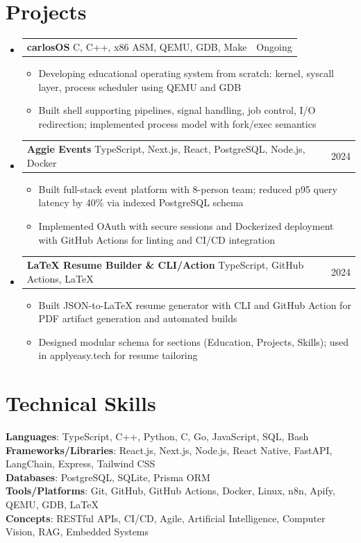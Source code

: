 \documentclass[letterpaper,11pt]{article}
\makeatletter
\newcommand{\resumeItem}[1]{
  \item\small{{#1 \vspace{-2pt}}}
}
\newcommand{\resumeProjectHeading}[2]{
    \item
    \begin{tabular*}{0.97\textwidth}{l@{\extracolsep{\fill}}r}
      \small#1 & #2 \\
    \end{tabular*}\vspace{-7pt}
}
\newcommand{\resumeSubHeadingListStart}{\begin{itemize}[leftmargin=0.15in, label={}]}
\newcommand{\resumeSubHeadingListEnd}{\end{itemize}}
\newcommand{\resumeItemListStart}{\begin{itemize}}
\newcommand{\resumeItemListEnd}{\end{itemize}\vspace{-5pt}}
\makeatother
\begin{document}
\section{Projects}
\resumeSubHeadingListStart
  \resumeProjectHeading
    {\textbf{carlosOS}  \textbullet{} C, C++, x86 ASM, QEMU, GDB, Make}{Ongoing}
    \resumeItemListStart
      \resumeItem{Developing educational operating system from scratch: kernel, syscall layer, process scheduler using QEMU and GDB}
      \resumeItem{Built shell supporting pipelines, signal handling, job control, I/O redirection; implemented process model with fork/exec semantics}
    \resumeItemListEnd

  \resumeProjectHeading
    {\textbf{Aggie Events} \textbullet{} TypeScript, Next.js, React, PostgreSQL, Node.js, Docker}{2024}
    \resumeItemListStart
      \resumeItem{Built full-stack event platform with 8-person team; reduced p95 query latency by 40\% via indexed PostgreSQL schema}
      \resumeItem{Implemented OAuth with secure sessions and Dockerized deployment with GitHub Actions for linting and CI/CD integration}
    \resumeItemListEnd

  \resumeProjectHeading
    {\textbf{LaTeX Resume Builder \& CLI/Action} \textbullet{} TypeScript, GitHub Actions, LaTeX}{2024}
    \resumeItemListStart
      \resumeItem{Built JSON-to-LaTeX resume generator with CLI and GitHub Action for PDF artifact generation and automated builds}
      \resumeItem{Designed modular schema for sections (Education, Projects, Skills); used in applyeasy.tech for resume tailoring}
    \resumeItemListEnd
\resumeSubHeadingListEnd

\section{Technical Skills}
\begin{itemize}[leftmargin=0.15in, label={}]
  \small{\item{
    \textbf{Languages}{: TypeScript, C++, Python, C, Go, JavaScript, SQL, Bash} \\
    \textbf{Frameworks/Libraries}{: React.js, Next.js, Node.js, React Native, FastAPI, LangChain, Express, Tailwind CSS} \\
    \textbf{Databases}{: PostgreSQL, SQLite, Prisma ORM} \\
    \textbf{Tools/Platforms}{: Git, GitHub, GitHub Actions, Docker, Linux, n8n, Apify, QEMU, GDB, LaTeX} \\
    \textbf{Concepts}{: RESTful APIs, CI/CD, Agile, Artificial Intelligence, Computer Vision, RAG, Embedded Systems}
  }}
\end{itemize}
\end{document}
